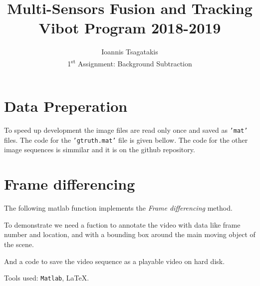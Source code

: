 \documentclass[a4paper,12pt]{article}
\begin{document}
\title{ Multi-Sensors Fusion and Tracking\\Vibot Program 2018-2019}
\author{Ioannis Tsagatakis\\
1\textsuperscript{st} Assignment: Background Subtraction} 
 
\maketitle

\section{Data Preperation}
To speed up development the image files are read only once and saved as \texttt{'mat'} files. The code for the \texttt{'gtruth.mat'} file is given bellow. The code for the other image sequences is simmilar and it is on the github repository.



\section{Frame differencing}
The following matlab function implements the \textit{Frame differencing} method.



To demonstrate we need a fuction to annotate the video with data like frame number and location, and with a bounding box around the main moving object of the scene.



And a code to save the video sequence as a playable video on hard disk.




\vfill
\noindent Tools used: \texttt{Matlab}, \LaTeX{}.
\end{document}
